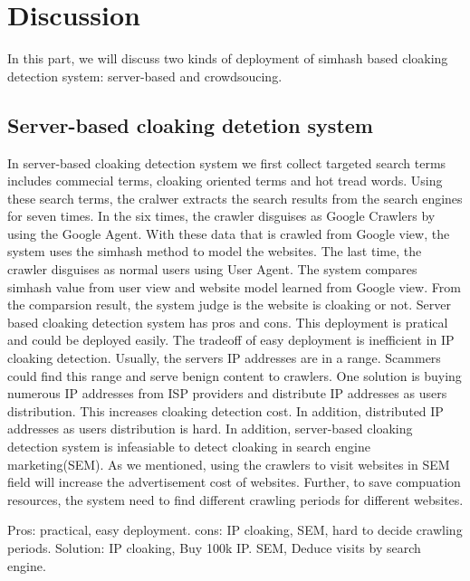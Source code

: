 \section{Discussion}
\label{s:discussion}

In this part, we will discuss two kinds of deployment of simhash based cloaking detection system: server-based and crowdsoucing.

\subsection{Server-based cloaking detetion system}
In server-based cloaking detection system
we first collect targeted search terms includes commecial terms, cloaking oriented terms and hot tread words.
Using these search terms, the cralwer extracts the search results from the search engines for seven times.
In the six times, the crawler disguises as Google Crawlers by using the Google Agent. With these
data that is crawled from Google view, the system uses the simhash method to model the websites. The last
time, the crawler disguises as normal users using User Agent. The system compares simhash value from user view and
website model learned from Google view. From the comparsion result, the system judge is the website is cloaking
or not. 
Server based cloaking detection system has pros and cons. This deployment is pratical and could be deployed
easily. The tradeoff of easy deployment is inefficient in IP cloaking detection. Usually, the servers IP addresses
are in a range. Scammers could find this range and serve benign content to crawlers. One solution is buying numerous IP addresses
from ISP providers and distribute IP addresses as users distribution. This increases cloaking detection cost. In
addition, distributed IP addresses as users distribution is hard. In addition, server-based cloaking detection system is infeasiable
to detect cloaking in search engine marketing(SEM). As we mentioned, using the crawlers to visit websites in SEM field
will increase the advertisement cost of websites. Further, to save compuation resources, the system need to find different 
crawling periods for different websites. 


Pros:	practical, easy deployment.
cons:	IP cloaking, SEM, hard to decide crawling periods. 
Solution: IP cloaking, Buy 100k IP.
SEM, Deduce visits by search engine. 

